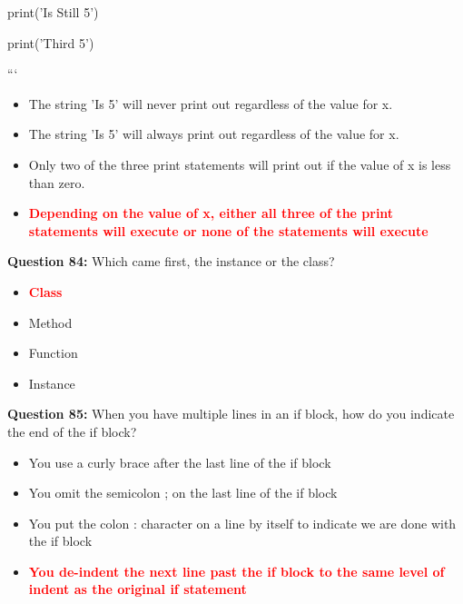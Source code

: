 \documentclass[12pt,a4paper]{article}
\begin{document}
\newline
    print('Is Still 5')\newline

\newline
    print('Third 5')\newline

\newline
```

\begin{itemize}
    \item[\textbf{A.}] The string 'Is 5' will never print out regardless of the value for x.
    \item[\textbf{B.}] The string 'Is 5' will always print out regardless of the value for x.
    \item[\textbf{C.}] Only two of the three print statements will print out if the value of x is less than zero.
    \item[\textbf{D.}] \textcolor{red}{\textbf{Depending on the value of x, either all three of the print statements will execute or none of the statements will execute}}
\end{itemize}

\vspace{0.5cm}

\textbf{Question 84:} Which came first, the instance or the class?

\begin{itemize}
    \item[\textbf{A.}] \textcolor{red}{\textbf{Class}}
    \item[\textbf{B.}] Method
    \item[\textbf{C.}] Function
    \item[\textbf{D.}] Instance
\end{itemize}

\vspace{0.5cm}

\textbf{Question 85:} When you have multiple lines in an if block, how do you indicate the end of the if block?

\begin{itemize}
    \item[\textbf{A.}] You use a curly brace  after the last line of the if block
    \item[\textbf{B.}] You omit the semicolon ; on the last line of the if block
    \item[\textbf{C.}] You put the colon : character on a line by itself to indicate we are done with the if block
    \item[\textbf{D.}] \textcolor{red}{\textbf{You de-indent the next line past the if block to the same level of indent as the original if statement}}
\end{itemize}
\end{document}
